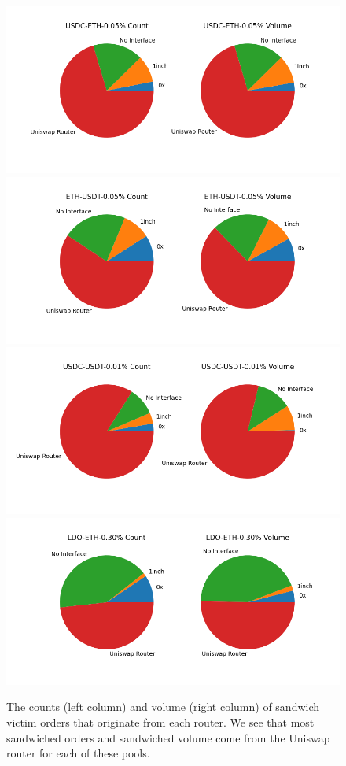 \begin{figure}[ht]
    \centering
    \includegraphics[scale=.43]{figs/meat-sources/USDC-ETH-0.05.png}
    \includegraphics[scale=.43]{figs/meat-sources/ETH-USDT-0.05.png}
    \includegraphics[scale=.43]{figs/meat-sources/USDC-USDT-0.01.png}
    \includegraphics[scale=.43]{figs/meat-sources/LDO-ETH-0.30.png}
    \caption{The counts (left column) and volume (right column) of sandwich victim orders that originate from each router. We see that most sandwiched orders and sandwiched volume come from the Uniswap router for each of these pools.}
\end{figure}